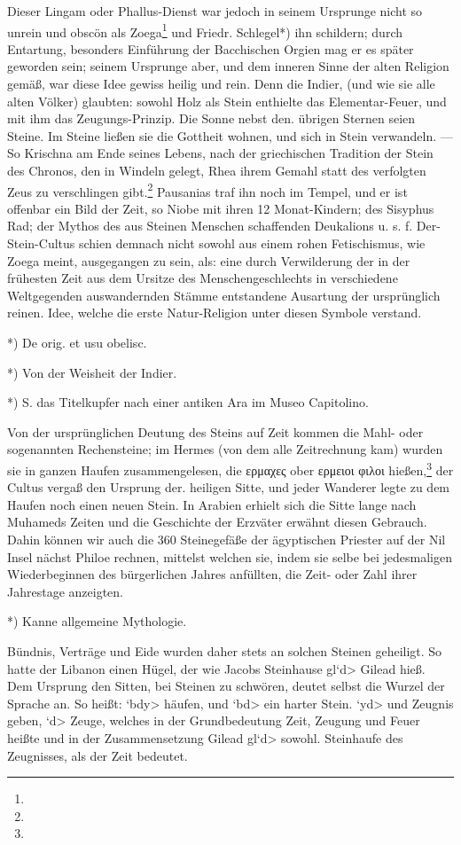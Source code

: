 \documentclass[a4paper, 11pt, oneside, polutonikogreek, german]{article}
\begin{document}
Dieser Lingam oder Phallus-Dienst war jedoch in seinem Ursprunge nicht so unrein und obscön als Zoega\footnote{} und Friedr. Schlegel*) ihn schildern; durch Entartung, besonders Einführung der Bacchischen Orgien mag er es später geworden sein; seinem Ursprunge aber, und dem inneren Sinne der alten Religion gemäß, war diese Idee gewiss heilig und rein. Denn die Indier, (und wie sie alle alten Völker) glaubten: sowohl Holz als Stein enthielte das Elementar-Feuer, und mit ihm das Zeugungs-Prinzip. Die Sonne nebst den. übrigen Sternen seien Steine. Im Steine ließen sie die Gottheit wohnen, und sich in Stein verwandeln. --- So Krischna am Ende seines Lebens, nach der griechischen Tradition der Stein des Chronos, den in Windeln gelegt, Rhea ihrem Gemahl statt des verfolgten Zeus zu verschlingen gibt.\footnote{} Pausanias traf ihn noch im Tempel, und er ist offenbar ein Bild der Zeit, so Niobe mit ihren 12 Monat-Kindern; des Sisyphus Rad; der Mythos des aus Steinen Menschen schaffenden Deukalions u. s. f. Der-Stein-Cultus schien demnach nicht sowohl aus einem rohen Fetischismus, wie Zoega meint, ausgegangen zu sein, als: eine durch Verwilderung der in der frühesten Zeit aus dem Ursitze des Menschengeschlechts in verschiedene Weltgegenden auswandernden Stämme entstandene Ausartung der ursprünglich reinen. Idee, welche die erste Natur-Religion unter diesen Symbole verstand.

*) De orig. et usu obelisc.

*) Von der Weisheit der Indier.

*) S. das Titelkupfer nach einer antiken Ara im Museo Capitolino.

Von der ursprünglichen Deutung des Steins auf Zeit kommen die Mahl- oder sogenannten Rechensteine; im Hermes (von dem alle Zeitrechnung kam) wurden sie in ganzen Haufen zusammengelesen, die ερμαχες ober ερμειοι φιλοι hießen,\footnote{} der Cultus vergaß den Ursprung der. heiligen Sitte, und jeder Wanderer legte zu dem Haufen noch einen neuen Stein. In Arabien erhielt sich die Sitte lange nach Muhameds Zeiten und die Geschichte der Erzväter erwähnt diesen Gebrauch. Dahin können wir auch die 360 Steinegefäße der ägyptischen Priester auf der Nil Insel nächst Philoe rechnen, mittelst welchen sie, indem sie selbe bei jedesmaligen Wiederbeginnen des bürgerlichen Jahres anfüllten, die Zeit- oder Zahl ihrer Jahrestage anzeigten.

*) Kanne allgemeine Mythologie.

Bündnis, Verträge und Eide wurden daher stets an solchen Steinen geheiligt. So hatte der Libanon einen Hügel, der wie Jacobs Steinhause \<gl`d> Gilead hieß. Dem Ursprung den Sitten, bei Steinen zu schwören, deutet selbst die Wurzel der Sprache an. So heißt: \<`bdy> häufen, und \<`bd> ein harter Stein. \<`yd> und Zeugnis geben, \<`d> Zeuge, welches in der Grundbedeutung Zeit, Zeugung und Feuer heißte und in der Zusammensetzung Gilead \<gl`d> sowohl. Steinhaufe des Zeugnisses, als der Zeit bedeutet.
\end{document}
